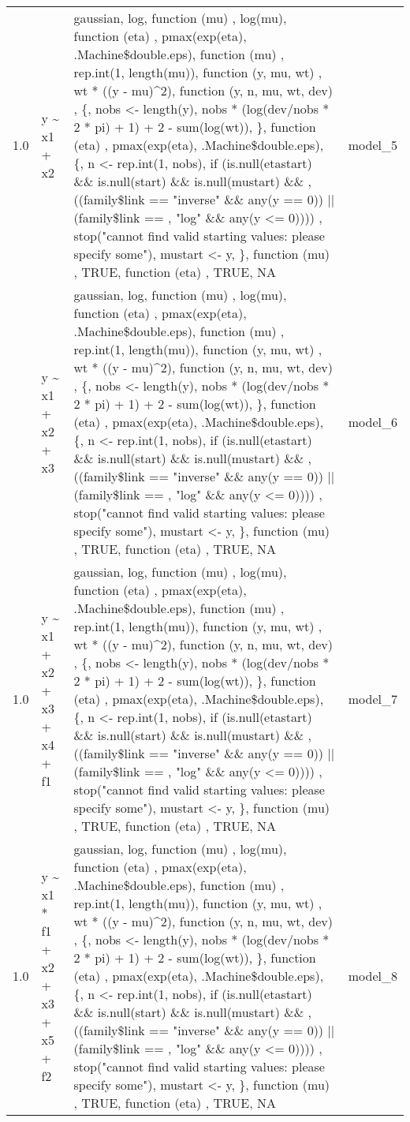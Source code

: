 \begin{tabular}{rlll}
1.0 & y \textasciitilde{} x1 + x2 & gaussian, log, function (mu) , log(mu), function (eta) , pmax(exp(eta), .Machine\$double.eps), function (mu) , rep.int(1, length(mu)), function (y, mu, wt) , wt * ((y - mu)\textasciicircum{}2), function (y, n, mu, wt, dev) , \{,     nobs <- length(y),     nobs * (log(dev/nobs * 2 * pi) + 1) + 2 - sum(log(wt)), \}, function (eta) , pmax(exp(eta), .Machine\$double.eps), \{,     n <- rep.int(1, nobs),     if (is.null(etastart) \&\& is.null(start) \&\& is.null(mustart) \&\& ,         ((family\$link == "inverse" \&\& any(y == 0)) || (family\$link == ,             "log" \&\& any(y <= 0)))) ,         stop("cannot find valid starting values: please specify some"),     mustart <- y, \}, function (mu) , TRUE, function (eta) , TRUE, NA & model\_5\\
\addlinespace
1.0 & y \textasciitilde{} x1 + x2 + x3 & gaussian, log, function (mu) , log(mu), function (eta) , pmax(exp(eta), .Machine\$double.eps), function (mu) , rep.int(1, length(mu)), function (y, mu, wt) , wt * ((y - mu)\textasciicircum{}2), function (y, n, mu, wt, dev) , \{,     nobs <- length(y),     nobs * (log(dev/nobs * 2 * pi) + 1) + 2 - sum(log(wt)), \}, function (eta) , pmax(exp(eta), .Machine\$double.eps), \{,     n <- rep.int(1, nobs),     if (is.null(etastart) \&\& is.null(start) \&\& is.null(mustart) \&\& ,         ((family\$link == "inverse" \&\& any(y == 0)) || (family\$link == ,             "log" \&\& any(y <= 0)))) ,         stop("cannot find valid starting values: please specify some"),     mustart <- y, \}, function (mu) , TRUE, function (eta) , TRUE, NA & model\_6\\
1.0 & y \textasciitilde{} x1 + x2 + x3 + x4 + f1 & gaussian, log, function (mu) , log(mu), function (eta) , pmax(exp(eta), .Machine\$double.eps), function (mu) , rep.int(1, length(mu)), function (y, mu, wt) , wt * ((y - mu)\textasciicircum{}2), function (y, n, mu, wt, dev) , \{,     nobs <- length(y),     nobs * (log(dev/nobs * 2 * pi) + 1) + 2 - sum(log(wt)), \}, function (eta) , pmax(exp(eta), .Machine\$double.eps), \{,     n <- rep.int(1, nobs),     if (is.null(etastart) \&\& is.null(start) \&\& is.null(mustart) \&\& ,         ((family\$link == "inverse" \&\& any(y == 0)) || (family\$link == ,             "log" \&\& any(y <= 0)))) ,         stop("cannot find valid starting values: please specify some"),     mustart <- y, \}, function (mu) , TRUE, function (eta) , TRUE, NA & model\_7\\
1.0 & y \textasciitilde{} x1 * f1 + x2 + x3 + x5 + f2 & gaussian, log, function (mu) , log(mu), function (eta) , pmax(exp(eta), .Machine\$double.eps), function (mu) , rep.int(1, length(mu)), function (y, mu, wt) , wt * ((y - mu)\textasciicircum{}2), function (y, n, mu, wt, dev) , \{,     nobs <- length(y),     nobs * (log(dev/nobs * 2 * pi) + 1) + 2 - sum(log(wt)), \}, function (eta) , pmax(exp(eta), .Machine\$double.eps), \{,     n <- rep.int(1, nobs),     if (is.null(etastart) \&\& is.null(start) \&\& is.null(mustart) \&\& ,         ((family\$link == "inverse" \&\& any(y == 0)) || (family\$link == ,             "log" \&\& any(y <= 0)))) ,         stop("cannot find valid starting values: please specify some"),     mustart <- y, \}, function (mu) , TRUE, function (eta) , TRUE, NA & model\_8\\

\end{tabular}
